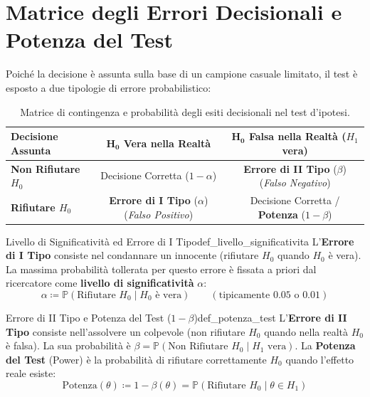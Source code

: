 \section{Matrice degli Errori Decisionali e Potenza del Test}
\label{sec:matrice_errori_potenza}

Poiché la decisione è assunta sulla base di un campione casuale limitato, il test è esposto a due tipologie di errore probabilistico:

\begin{table}[htbp]
    \centering
    \caption{Matrice di contingenza e probabilità degli esiti decisionali nel test d'ipotesi.}
    \label{tab:matrice_errori}
    \begin{tabular}{lcc}
        \toprule
        \textbf{Decisione Assunta} & $\bm{H_0}$ \textbf{Vera nella Realtà} & $\bm{H_0}$ \textbf{Falsa nella Realtà ($H_1$ vera)} \\
        \midrule
        \textbf{Non Rifiutare $H_0$} & Decisione Corretta ($1 - \alpha$) & \textbf{Errore di II Tipo} ($\beta$) (\emph{Falso Negativo}) \\[8pt]
        \textbf{Rifiutare $H_0$} & \textbf{Errore di I Tipo} ($\alpha$) (\emph{Falso Positivo}) & Decisione Corretta / \textbf{Potenza} ($1 - \beta$) \\
        \bottomrule
    \end{tabular}
\end{table}

\begin{definizione}{Livello di Significatività ed Errore di I Tipo}{def_livello_significativita}
L'\textbf{Errore di I Tipo} consiste nel condannare un innocente (rifiutare $H_0$ quando $H_0$ è vera). La massima probabilità tollerata per questo errore è fissata a priori dal ricercatore come \textbf{livello di significatività} $\alpha$:
\begin{equation}
    \alpha \coloneqq \mathbb{P}(\text{Rifiutare } H_0 \mid H_0 \text{ è vera}) \qquad (\text{tipicamente } 0.05 \text{ o } 0.01)
\end{equation}
\end{definizione}

\begin{definizione}{Errore di II Tipo e Potenza del Test ($1-\beta$)}{def_potenza_test}
L'\textbf{Errore di II Tipo} consiste nell'assolvere un colpevole (non rifiutare $H_0$ quando nella realtà $H_0$ è falsa). La sua probabilità è $\beta = \mathbb{P}(\text{Non Rifiutare } H_0 \mid H_1 \text{ vera})$.
La \textbf{Potenza del Test} (Power) è la probabilità di rifiutare correttamente $H_0$ quando l'effetto reale esiste:
\begin{equation}
    \text{Potenza}(\theta) \coloneqq 1 - \beta(\theta) = \mathbb{P}(\text{Rifiutare } H_0 \mid \theta \in H_1)
\end{equation}
\end{definizione}


